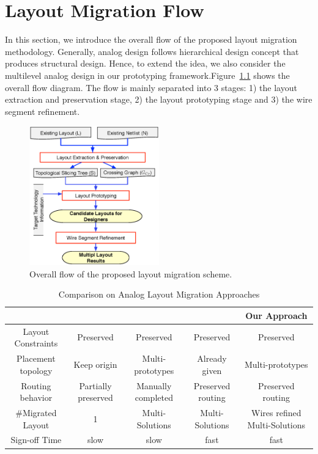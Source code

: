 \chapter{Layout Migration Flow}\label{chap:migration}

  In this section, we introduce the overall flow of the proposed layout migration methodology.
  Generally, analog design follows hierarchical design concept that produces structural design. 
  Hence, to extend the idea, we also consider the multilevel analog design in our prototyping framework.Figure~\ref{fig:Flow} shows the overall flow diagram.
  The flow is mainly separated into 3 stages: 1) the layout extraction and preservation stage, 2) the layout prototyping stage and 3) the wire segment refinement. 
  
  
  \begin{figure}[ht]
  \centering
  \includegraphics[width=0.5\textwidth]{Fig/Flow.eps}
  \caption{Overall flow of the proposed layout migration scheme.} 
  \label{fig:Flow}
  \end{figure}

  \begin{table}
    \begin{center}
    \caption{Comparison on Analog Layout Migration Approaches}\label{table:MigrateComp}
    \scriptsize
    \begin{tabular}{|c|c|c|c|c|}
      \hline
      & \cite{msc-bhattacharya-tcad06} & \cite{ALP_YPWeng_iccad2011} & \cite{Chin_DMR_ICCAD2013} & Our Approach \\
      \hline
      Layout Constraints & Preserved & Preserved & Preserved & Preserved \\
      \hline
      Placement topology  & Keep origin & Multi-prototypes & Already given & Multi-prototypes \\
      \hline  
      Routing behavior  & Partially preserved &  Manually completed &  Preserved routing & Preserved routing \\
      \hline
      \#Migrated Layout &  1 &  Multi-Solutions & Multi-Solutions & Wires refined Multi-Solutions \\
      \hline
      Sign-off Time &   slow &  slow &  fast &  fast \\
      \hline
    \end{tabular}
    \end{center}
  \end{table}

